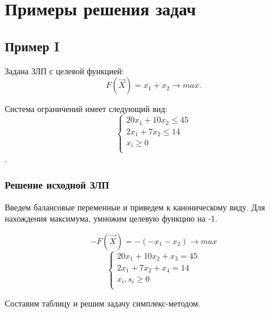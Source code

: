 \chapter{Примеры решения задач}
\section{Пример I}

\renewcommand{\labelenumi}{\arabic{enumi})}
Задана ЗЛП с целевой функцией:
\begin{equation}
	F(\vec{X}) = x_1+x_2 \to max.
\end{equation}

Система ограничений имеет следующий вид:
\begin{equation}
\begin{cases}
20x_1+10x_2 \le 45\\
2x_1+7x_2 \le 14\\
x_i \ge 0 \\
\end{cases}
\end{equation}.

\subsection{Решение исходной ЗЛП}
Введем балансовые переменные и приведем к каноническому виду.
Для нахождения максимума, умножим целевую функцию на -1.

$$-F(\vec{X}) = -(-x_1-x_2) \to max$$
\begin{equation}
\begin{cases}
20x_1+10x_2+x_3=45\\
2x_1+7x_2+x_4=14\\
x_i, s_i \ge 0 \\
\end{cases}
\end{equation}

Составим таблицу и решим задачу симплекс-методом.

